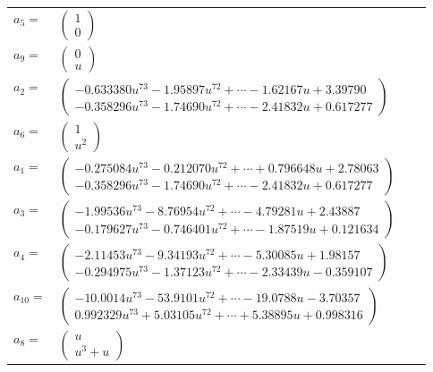 \documentclass[1p]{elsarticle_modified}
\theoremstyle{definition}
\begin{document}
\begin{tabular}{m{7pt} m{180pt} m{7pt} m{180pt} }
\flushright $a_{5}=$&$\begin{pmatrix}1\\0\end{pmatrix}$ \\
\flushright $a_{9}=$&$\begin{pmatrix}0\\u\end{pmatrix}$ \\
\flushright $a_{2}=$&$\begin{pmatrix}-0.633380 u^{73}-1.95897 u^{72}+\cdots-1.62167 u+3.39790\\-0.358296 u^{73}-1.74690 u^{72}+\cdots-2.41832 u+0.617277\end{pmatrix}$ \\
\flushright $a_{6}=$&$\begin{pmatrix}1\\u^2\end{pmatrix}$ \\
\flushright $a_{1}=$&$\begin{pmatrix}-0.275084 u^{73}-0.212070 u^{72}+\cdots+0.796648 u+2.78063\\-0.358296 u^{73}-1.74690 u^{72}+\cdots-2.41832 u+0.617277\end{pmatrix}$ \\
\flushright $a_{3}=$&$\begin{pmatrix}-1.99536 u^{73}-8.76954 u^{72}+\cdots-4.79281 u+2.43887\\-0.179627 u^{73}-0.746401 u^{72}+\cdots-1.87519 u+0.121634\end{pmatrix}$ \\
\flushright $a_{4}=$&$\begin{pmatrix}-2.11453 u^{73}-9.34193 u^{72}+\cdots-5.30085 u+1.98157\\-0.294975 u^{73}-1.37123 u^{72}+\cdots-2.33439 u-0.359107\end{pmatrix}$ \\
\flushright $a_{10}=$&$\begin{pmatrix}-10.0014 u^{73}-53.9101 u^{72}+\cdots-19.0788 u-3.70357\\0.992329 u^{73}+5.03105 u^{72}+\cdots+5.38895 u+0.998316\end{pmatrix}$ \\
\flushright $a_{8}=$&$\begin{pmatrix}u\\u^3+u\end{pmatrix}$ \\

\end{tabular}
\end{document}
